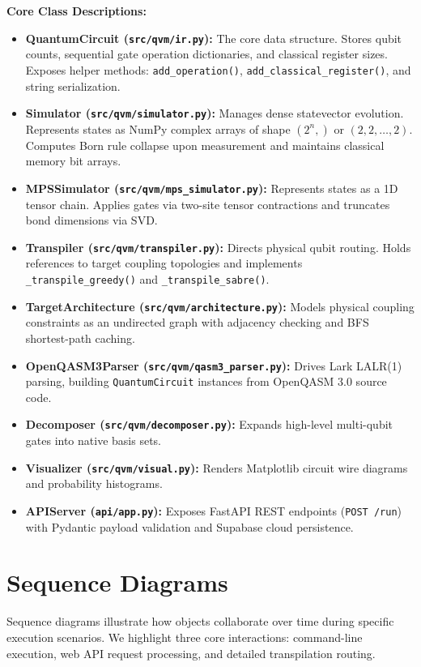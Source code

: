 \textbf{Core Class Descriptions:}
\begin{itemize}[leftmargin=*]
    \item \textbf{QuantumCircuit (\texttt{src/qvm/ir.py}):} The core data structure. Stores qubit counts, sequential gate operation dictionaries, and classical register sizes. Exposes helper methods: \texttt{add\_operation()}, \texttt{add\_classical\_register()}, and string serialization.
    \item \textbf{Simulator (\texttt{src/qvm/simulator.py}):} Manages dense statevector evolution. Represents states as NumPy complex arrays of shape $(2^n,)$ or $(2,2,\dots,2)$. Computes Born rule collapse upon measurement and maintains classical memory bit arrays.
    \item \textbf{MPSSimulator (\texttt{src/qvm/mps\_simulator.py}):} Represents states as a 1D tensor chain. Applies gates via two-site tensor contractions and truncates bond dimensions via SVD.
    \item \textbf{Transpiler (\texttt{src/qvm/transpiler.py}):} Directs physical qubit routing. Holds references to target coupling topologies and implements \texttt{\_transpile\_greedy()} and \texttt{\_transpile\_sabre()}.
    \item \textbf{TargetArchitecture (\texttt{src/qvm/architecture.py}):} Models physical coupling constraints as an undirected graph with adjacency checking and BFS shortest-path caching.
    \item \textbf{OpenQASM3Parser (\texttt{src/qvm/qasm3\_parser.py}):} Drives Lark LALR(1) parsing, building \texttt{QuantumCircuit} instances from OpenQASM 3.0 source code.
    \item \textbf{Decomposer (\texttt{src/qvm/decomposer.py}):} Expands high-level multi-qubit gates into native basis sets.
    \item \textbf{Visualizer (\texttt{src/qvm/visual.py}):} Renders Matplotlib circuit wire diagrams and probability histograms.
    \item \textbf{APIServer (\texttt{api/app.py}):} Exposes FastAPI REST endpoints (\texttt{POST /run}) with Pydantic payload validation and Supabase cloud persistence.
\end{itemize}

\section{Sequence Diagrams}
Sequence diagrams illustrate how objects collaborate over time during specific execution scenarios. We highlight three core interactions: command-line execution, web API request processing, and detailed transpilation routing.

